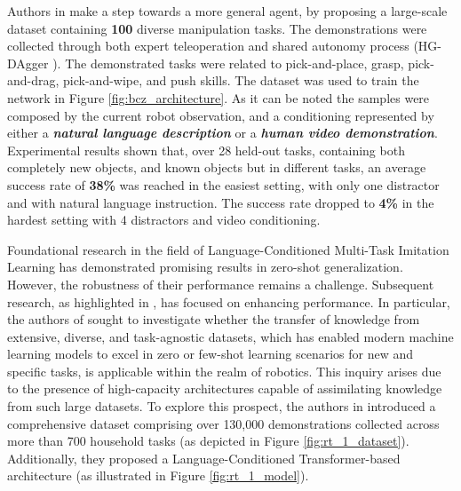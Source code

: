 Authors in \cite{jang2022bc_z} make a step towards a more general agent, by proposing a large-scale dataset containing \textbf{100} diverse manipulation tasks. The demonstrations were collected through both expert teleoperation and shared autonomy process (HG-DAgger \cite{kelly2019hg_dagger}). The demonstrated tasks were related to pick-and-place, grasp, pick-and-drag, pick-and-wipe, and push skills. The dataset was used to train the network in Figure \ref{fig:bcz_architecture}. As it can be noted the samples were composed by the current robot observation, and a conditioning represented by either a \textit{\textbf{natural language description}} or a \textit{\textbf{human video demonstration}}.
Experimental results shown that, over 28 held-out tasks, containing both completely new objects, and known objects but in different tasks, an average success rate of \textbf{38\%} was reached in the easiest setting, with only one distractor and with natural language instruction. The success rate dropped to \textbf{4\%} in the hardest setting with 4 distractors and video conditioning.

\newline Foundational research in the field of Language-Conditioned Multi-Task Imitation Learning has demonstrated promising results in zero-shot generalization. However, the robustness of their performance remains a challenge. Subsequent research, as highlighted in \cite{brohan2022rt,mees2022calvin,mees2022hulc}, has focused on enhancing performance. In particular, the authors of \cite{brohan2022rt} sought to investigate whether the transfer of knowledge from extensive, diverse, and task-agnostic datasets, which has enabled modern machine learning models to excel in zero or few-shot learning scenarios for new and specific tasks, is applicable within the realm of robotics. This inquiry arises due to the presence of high-capacity architectures capable of assimilating knowledge from such large datasets. To explore this prospect, the authors in \cite{brohan2022rt} introduced a comprehensive dataset comprising over 130,000 demonstrations collected across more than 700 household tasks (as depicted in Figure \ref{fig:rt_1_dataset}). Additionally, they proposed a Language-Conditioned Transformer-based architecture (as illustrated in Figure \ref{fig:rt_1_model}).


